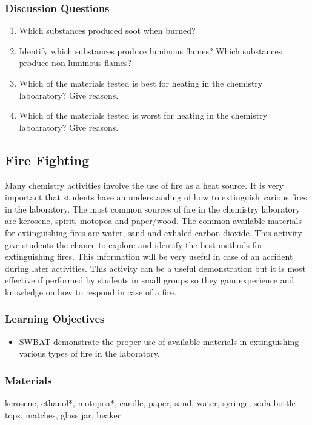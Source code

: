 \subsubsection*{Discussion Questions}
\begin{enumerate}
\item{Which substances produced soot when burned?}
\item{Identify which substances produce luminous flames? Which substances produce non-luminous flames?}
\item{Which of the materials tested is best for heating in the chemistry laboaratory? Give reasons.}
\item{Which of the materials tested is worst for heating in the chemistry laboaratory? Give reasons.}
\end{enumerate}

\subsection{Fire Fighting}
Many chemistry activities involve the use of fire as a heat source. It is very important that students have an understanding of how to extinguish various fires in the laboratory. The most common sources of fire in the chemistry laboratory are kerosene, spirit, motopoa and paper/wood. The common available materials for extinguishing fires are water, sand and exhaled carbon dioxide. This activity give students the chance to explore and identify the best methods for extinguishing fires. This information will be very useful in case of an accident during later activities. This activity can be a useful demonstration but it is most effective if performed by students in small groups so they gain experience and knowledge on how to respond in case of a fire.
\subsubsection*{Learning Objectives}
\begin{itemize}
\item{SWBAT demonstrate the proper use of available materials in extinguishing various types of fire in the laboratory.}
\end{itemize}

\subsubsection*{Materials}
kerosene, ethanol*, motopoa*, candle, paper, sand, water, syringe, soda bottle tops, matches, glass jar, beaker


